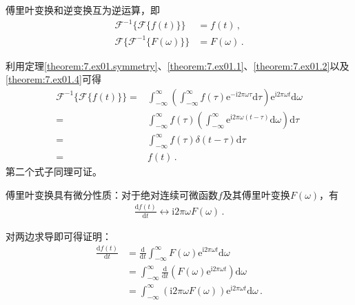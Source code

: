 \begin{theorem}
    傅里叶变换和逆变换互为逆运算，即
    \begin{align}
        \mathcal{F}^{-1}\{\mathcal{F}\{f(t)\}\}      & =f(t)\, ,      \\
        \mathcal{F}\{\mathcal{F}^{-1}\{F(\omega)\}\} & =F(\omega)\, .
    \end{align}
\end{theorem}
\begin{prove}
    利用定理\ref{theorem:7.ex01.symmetry}、\ref{theorem:7.ex01.1}、\ref{theorem:7.ex01.2}以及\ref{theorem:7.ex01.4}可得
    \begin{align}
        \mathcal{F}^{-1}\{\mathcal{F}\{f(t)\}\}= & \int_{-\infty}^{\infty}\left(\int_{-\infty}^{\infty}f(\tau)\mathrm{e}^{-\mathrm{i}2\pi\omega\tau}\mathrm{d}\tau\right)\mathrm{e}^{\mathrm{i}2\pi\omega t}\mathrm{d}\omega\nonumber \\
        =                                        & \int_{-\infty}^{\infty}f(\tau)\left(\int_{-\infty}^{\infty}\mathrm{e}^{\mathrm{i}2\pi\omega(t-\tau)}\mathrm{d}\omega\right)\mathrm{d}\tau\nonumber                                 \\
        =                                        & \int_{-\infty}^{\infty}f(\tau)\delta(t-\tau)\mathrm{d}\tau\nonumber                                                                                                                \\
        =                                        & f(t)\, .
    \end{align}
    第二个式子同理可证。
\end{prove}

\begin{theorem}
    傅里叶变换具有微分性质：对于绝对连续可微函数$f$及其傅里叶变换$F(\omega)$，有
    \begin{align}
        \frac{\mathrm{d}f(t)}{\mathrm{d}t}\leftrightarrow\mathrm{i}2\pi\omega F(\omega)\, .
    \end{align}
\end{theorem}
\begin{prove}
    对两边求导即可得证明：
    \begin{align}
        \frac{\mathrm{d}f(t)}{\mathrm{d}t} & =\frac{\mathrm{d}}{\mathrm{d}t}\int_{-\infty}^{\infty}F(\omega)\mathrm{e}^{\mathrm{i}2\pi\omega t}\mathrm{d}\omega\nonumber              \\
                                           & =\int_{-\infty}^{\infty}\frac{\mathrm{d}}{\mathrm{d}t}\left(F(\omega)\mathrm{e}^{\mathrm{i}2\pi\omega t}\right)\mathrm{d}\omega\nonumber \\
                                           & =\int_{-\infty}^{\infty}(\mathrm{i}2\pi\omega F(\omega))\mathrm{e}^{\mathrm{i}2\pi\omega t}\mathrm{d}\omega\, .
    \end{align}
\end{prove}

